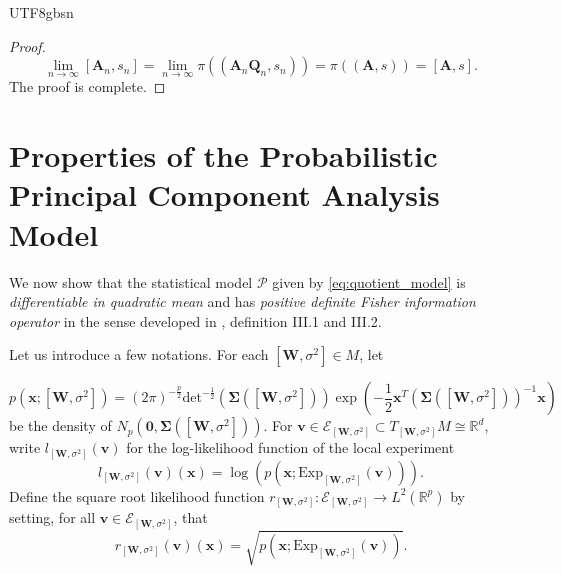 \documentclass[12pt]{report}
\newcommand{\bracket}[1]{\left ( #1 \right )}
\newcommand{\squared}[1]{\left [ #1 \right ]}
\theoremstyle{plain}
\theoremstyle{definition}
\begin{document}
\begin{CJK*}{UTF8}{gbsn}
\begin{proof}
\begin{equation*}
  \lim_{n \to \infty} \squared{\bm{A}_n, s_n}
  = \lim_{n \to \infty} \pi((\bm{A}_n\bm{Q}_n, s_n))
  = \pi((\bm{A}, s)) = \squared{\bm{A}, s}.
\end{equation*}
The proof is complete.
\end{proof}

\section{Properties of the Probabilistic Principal Component Analysis Model}\label{sec:PPCA_properties}
We now show that the statistical model $\mathcal{P}$ 
given by \eqref{eq:quotient_model}
is \textit{differentiable in quadratic mean}
and has \textit{positive definite Fisher information operator} 
in the sense developed in \cite{Sun_Lin_Liu_2026}, definition 
III.1 and III.2.

Let us introduce a few notations.
For each $[\bm{W},\sigma^2] \in M$,
let

\begin{equation}\label{eq:p_def}
  p(\bm{x}; [\bm{W},\sigma^2])
  = (2\pi)^{-\frac{p}{2}} \text{det}^{-\frac{1}{2}}(\bm{\Sigma}([\bm{W},\sigma^2])) \exp \bracket{- 
  \frac{1}{2}\bm{x}^T(\bm{\Sigma}([\bm{W},\sigma^2]))^{-1}\bm{x}}
\end{equation}
be the density of $N_p(\bm{0}, \bm{\Sigma}([\bm{W},\sigma^2]))$.
For $\bm{v} \in \mathcal{E}_{[\bm{W},\sigma^2]} \subset T_{[\bm{W},\sigma^2]}M \cong \mathbb{R}^{d}$,
write $l_{[\bm{W},\sigma^2]}(\bm{v})$
for the log-likelihood function of the local experiment
\begin{equation}\label{eq:l_def}
  l_{[\bm{W},\sigma^2]}(\bm{v})(\bm{x}) = \log 
  \bracket{p(\bm{x}; \text{Exp}_{[\bm{W},\sigma^2]}(\bm{v}))}.
\end{equation}
Define the square root likelihood function $r_{[\bm{W},\sigma^2]} : 
\mathcal{E}_{[\bm{W},\sigma^2]} \to L^2(\mathbb{R}^p)$
by setting, for all $\bm{v} \in \mathcal{E}_{[\bm{W},\sigma^2]}$,
that 
\begin{equation}\label{eq:r_def}
  r_{[\bm{W},\sigma^2]}(\bm{v})(\bm{x}) = 
  \sqrt{p(\bm{x}; \text{Exp}_{[\bm{W},\sigma^2]}(\bm{v}))}.
\end{equation}


\end{CJK*}
\end{document}
